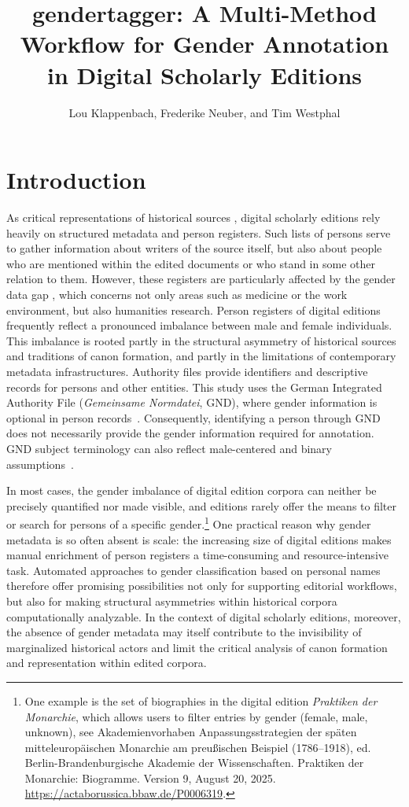 \documentclass{eceasst}
\title{%
gendertagger: A Multi-Method Workflow for Gender Annotation in Digital Scholarly Editions}
\author{%
Lou Klappenbach\authorOrcid{0000-0001-6587-3353}\autref{1},
Frederike Neuber\authorOrcid{0000-0001-8279-9298}\autref{2}, and
Tim Westphal\authorOrcid{0009-0000-8580-4558}\autref{3}}
\institute{%
\autlabel{1} \email{klappenbach@bbaw.de}\\
\autlabel{2} \email{neuber@bbaw.de}\\
\autlabel{3} \email{westphal@bbaw.de}\\
TELOTA, Berlin-Brandenburg Academy of Sciences and Humanities}
\begin{document}
\maketitle

\section{Introduction}
\label{sec:intro}

As critical representations of historical sources \cite{sahle_digitale_2013}, digital scholarly editions rely heavily on structured metadata and person registers. Such lists of persons serve to gather information about writers of the source itself, but also about people who are mentioned within the edited documents or who stand in some other relation to them. However, these registers are particularly affected by the gender data gap \cite{criado-perez_invisible_2020}, which concerns not only areas such as medicine or the work environment, but also humanities research. Person registers of digital editions frequently reflect a pronounced imbalance between male and female individuals. This imbalance is rooted partly in the structural asymmetry of historical sources and traditions of canon formation, and partly in the limitations of contemporary metadata infrastructures. Authority files provide identifiers and descriptive records for persons and other entities. This study uses the German Integrated Authority File (\emph{Gemeinsame Normdatei}, GND), where gender information is optional in person records~\cite{sta_gnd_gender_2026}. Consequently, identifying a person through GND does not necessarily provide the gender information required for annotation. GND subject terminology can also reflect male-centered and binary assumptions~\cite{aleksander_gendern_2025}.

In most cases, the gender imbalance of digital edition corpora can neither be precisely quantified nor made visible, and editions rarely offer the means to filter or search for persons of a specific gender.\footnote{One example is the set of biographies in the digital edition \textit{Praktiken der Monarchie}, which allows users to filter entries by gender (female, male, unknown), see Akademienvorhaben Anpassungsstrategien der späten mitteleuropäischen Monarchie am preußischen Beispiel (1786–1918), ed. Berlin-Brandenburgische Akademie der Wissenschaften. Praktiken der Monarchie: Biogramme. Version 9, August 20, 2025. \url{https://actaborussica.bbaw.de/P0006319}.} One practical reason why gender metadata is so often absent is scale: the increasing size of digital editions makes manual enrichment of person registers a time-consuming and resource-intensive task. Automated approaches to gender classification based on personal names therefore offer promising possibilities not only for supporting editorial workflows, but also for making structural asymmetries within historical corpora computationally analyzable. In the context of digital scholarly editions, moreover, the absence of gender metadata may itself contribute to the invisibility of marginalized historical actors and limit the critical analysis of canon formation and representation within edited corpora.
\end{document}
